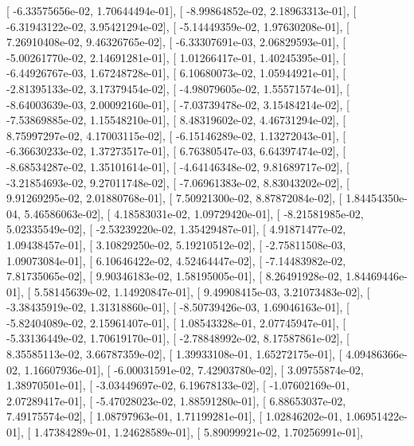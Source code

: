 \documentclass{article}
\begin{document}
       [ -6.33575656e-02,   1.70644494e-01],
       [ -8.99864852e-02,   2.18963313e-01],
       [ -6.31943122e-02,   3.95421294e-02],
       [ -5.14449359e-02,   1.97630208e-01],
       [  7.26910408e-02,   9.46326765e-02],
       [ -6.33307691e-03,   2.06829593e-01],
       [ -5.00261770e-02,   2.14691281e-01],
       [  1.01266417e-01,   1.40245395e-01],
       [ -6.44926767e-03,   1.67248728e-01],
       [  6.10680073e-02,   1.05944921e-01],
       [ -2.81395133e-02,   3.17379454e-02],
       [ -4.98079605e-02,   1.55571574e-01],
       [ -8.64003639e-03,   2.00092160e-01],
       [ -7.03739478e-02,   3.15484214e-02],
       [ -7.53869885e-02,   1.15548210e-01],
       [  8.48319602e-02,   4.46731294e-02],
       [  8.75997297e-02,   4.17003115e-02],
       [ -6.15146289e-02,   1.13272043e-01],
       [ -6.36630233e-02,   1.37273517e-01],
       [  6.76380547e-03,   6.64397474e-02],
       [ -8.68534287e-02,   1.35101614e-01],
       [ -4.64146348e-02,   9.81689717e-02],
       [ -3.21854693e-02,   9.27011748e-02],
       [ -7.06961383e-02,   8.83043202e-02],
       [  9.91269295e-02,   2.01880768e-01],
       [  7.50921300e-02,   8.87872084e-02],
       [  1.84454350e-04,   5.46586063e-02],
       [  4.18583031e-02,   1.09729420e-01],
       [ -8.21581985e-02,   5.02335549e-02],
       [ -2.53239220e-02,   1.35429487e-01],
       [  4.91871477e-02,   1.09438457e-01],
       [  3.10829250e-02,   5.19210512e-02],
       [ -2.75811508e-03,   1.09073084e-01],
       [  6.10646422e-02,   4.52464447e-02],
       [ -7.14483982e-02,   7.81735065e-02],
       [  9.90346183e-02,   1.58195005e-01],
       [  8.26491928e-02,   1.84469446e-01],
       [  5.58145639e-02,   1.14920847e-01],
       [  9.49908415e-03,   3.21073483e-02],
       [ -3.38435919e-02,   1.31318860e-01],
       [ -8.50739426e-03,   1.69046163e-01],
       [ -5.82404089e-02,   2.15961407e-01],
       [  1.08543328e-01,   2.07745947e-01],
       [ -5.33136449e-02,   1.70619170e-01],
       [ -2.78848992e-02,   8.17587861e-02],
       [  8.35585113e-02,   3.66787359e-02],
       [  1.39933108e-01,   1.65272175e-01],
       [  4.09486366e-02,   1.16607936e-01],
       [ -6.00031591e-02,   7.42903780e-02],
       [  3.09755874e-02,   1.38970501e-01],
       [ -3.03449697e-02,   6.19678133e-02],
       [ -1.07602169e-01,   2.07289417e-01],
       [ -5.47028023e-02,   1.88591280e-01],
       [  6.88653037e-02,   7.49175574e-02],
       [  1.08797963e-01,   1.71199281e-01],
       [  1.02846202e-01,   1.06951422e-01],
       [  1.47384289e-01,   1.24628589e-01],
       [  5.89099921e-02,   1.70256991e-01],
\end{document}
